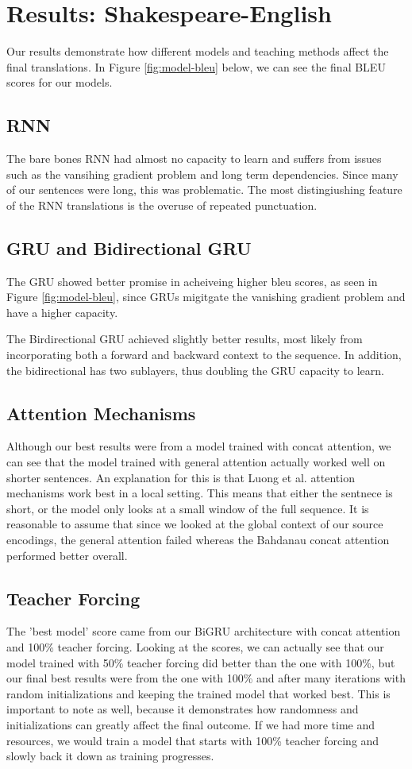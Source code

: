 \documentclass[twoside,twocolumn]{article}
\begin{document}
\section{Results: Shakespeare-English}
Our results demonstrate how different models and teaching methods affect the
final translations. In Figure \ref{fig:model-bleu} below, we can see the
final BLEU scores for our models.

\subsection{RNN}
The bare bones RNN had almost no capacity to learn and suffers from issues
such as the vansihing gradient problem and long term dependencies. Since many
of our sentences were long, this was problematic. The most distingiushing
feature of the RNN translations is the overuse of repeated punctuation.

\subsection{GRU and Bidirectional GRU}
The GRU showed better promise in acheiveing higher bleu scores, as seen in
Figure \ref{fig:model-bleu}, since GRUs migitgate the vanishing gradient
problem and have a higher capacity.

The Birdirectional GRU achieved slightly better results, most likely from
incorporating both a forward and backward context to the sequence. In addition,
the bidirectional has two sublayers, thus doubling the GRU capacity to learn.

\subsection{Attention Mechanisms}
Although our best results were from a model trained with concat attention, we
can see that the model trained with general attention actually worked well on
shorter sentences. An explanation for this is that Luong et al.
\cite{luong2015effective} attention mechanisms work best in a local setting.
This means that either the sentnece is short, or the model only looks at a
small window of the full sequence. It is reasonable to assume that since we
looked at the global context of our source encodings, the general attention
failed whereas the Bahdanau \cite{bahdanau2014neural} concat attention
performed better overall.

\subsection{Teacher Forcing}
The 'best model' score came from our BiGRU architecture with concat attention
and 100\% teacher forcing. Looking at the scores, we can actually see that our
model trained with 50\% teacher forcing did better than the one with 100\%, but
our final best results were from the one with 100\% and after many iterations
with random initializations and keeping the trained model that worked best.
This is important to note as well, because it demonstrates how randomness and
initializations can greatly affect the final outcome. If we had more time and
resources, we would train a model that starts with 100\% teacher forcing and
slowly back it down as training progresses.
\end{document}
